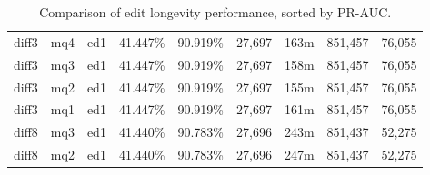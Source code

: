 \begin{sidewaystable}[!ph]
\begin{center}
\begin{tabular}{|c|c|c||c|c||c|c|c|c|}
diff3 & mq4 & ed1 & 41.447\% & 90.919\% & 27,697 & 163m & 851,457 & 76,055 \\
diff3 & mq3 & ed1 & 41.447\% & 90.919\% & 27,697 & 158m & 851,457 & 76,055 \\
diff3 & mq2 & ed1 & 41.447\% & 90.919\% & 27,697 & 155m & 851,457 & 76,055 \\
diff3 & mq1 & ed1 & 41.447\% & 90.919\% & 27,697 & 161m & 851,457 & 76,055 \\
diff8 & mq3 & ed1 & 41.440\% & 90.783\% & 27,696 & 243m & 851,437 & 52,275 \\
diff8 & mq2 & ed1 & 41.440\% & 90.783\% & 27,696 & 247m & 851,437 & 52,275 \\
\hline
\end{tabular}
\end{center}
\caption{Comparison of edit longevity performance,
    sorted by PR-AUC.}
\label{tab:editshoutG}
\end{sidewaystable}
\clearpage
